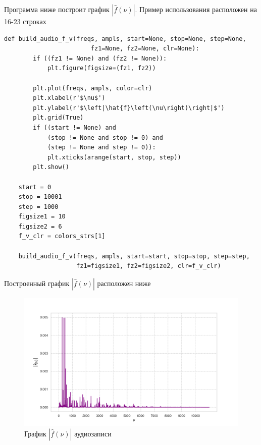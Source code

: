 \documentclass[a4paper, 16pt]{article}
\begin{document}
    \noindent Программа ниже построит график $|\hat{f}(\nu)|$. Пример использования расположен на 16-23 строках
    \begin{lstlisting}[label=f_v_mp3, caption=Программа для построения графика $|\hat{f}(\nu)|$ аудиозаписи]
    def build_audio_f_v(freqs, ampls, start=None, stop=None, step=None,
                        fz1=None, fz2=None, clr=None):
        if ((fz1 != None) and (fz2 != None)):
            plt.figure(figsize=(fz1, fz2))

        plt.plot(freqs, ampls, color=clr)
        plt.xlabel(r'$\nu$')
        plt.ylabel(r'$\left|\hat{f}\left(\nu\right)\right|$')
        plt.grid(True)
        if ((start != None) and
            (stop != None and stop != 0) and
            (step != None and step != 0)):
            plt.xticks(arange(start, stop, step))
        plt.show()

    start = 0
    stop = 10001
    step = 1000
    figsize1 = 10
    figsize2 = 6
    f_v_clr = colors_strs[1]

    build_audio_f_v(freqs, ampls, start=start, stop=stop, step=step,
                    fz1=figsize1, fz2=figsize2, clr=f_v_clr)
    \end{lstlisting}


    \noindent Построенный график $|\hat{f}(\nu)|$ расположен ниже
    \begin{figure}[!htb]
        \centering
        \includegraphics[scale=0.5]{f_v.png}
        \captionsetup{skip=0pt}
        \caption{График $|\hat{f}(\nu)|$ аудиозаписи}
        \label{Рис:16}
    \end{figure}
\end{document}
